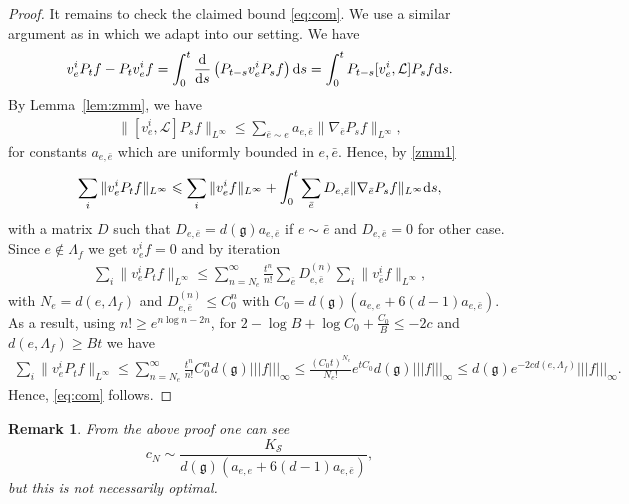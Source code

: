 \documentclass[11pt,UTF-8,reqno]{amsart}
\numberwithin{equation}{section}
\newtheorem{remark}[theorem]{Remark}
\def\${|\!|\!|}
\def\<{{\langle}}
\def\>{{\rangle}}
\def\dif{{\mathord{{\rm d}}}}
\def\={&\!\!=\!\!&}
\def\cL{{\mathcal L}}
\def\cS{{\mathcal S}}
\def\geq{\geqslant}
\def\leq{\leqslant}
\def\<{{\langle}}
\def\>{{\rangle}}
\def\dif{{\mathord{{\rm d}}}}
\def\={&\!\!=\!\!&}
\def\br{\begin{remark}}
\def\er{\end{remark}}
\def\mfg{\mathfrak{g}}
\def\geq{\geqslant}
\def\leq{\leqslant}
\def\dg{d(\mfg)}
\def\<{\langle} \def\>{\rangle}
\begin{document}
\begin{proof}
	It remains to check the claimed bound \eqref{eq:com}. We use a similar argument as in \cite[Theorem 8.2]{GZ} which we adapt into our setting.  We have
	\begin{align}\label{zmm1}
		v_e^iP_tf-P_tv_e^if=\int_0^t\frac{\dif}{\dif s} \left( P_{t-s}v_e^iP_sf\right)\dif s=\int_0^tP_{t-s}[v_e^i,\cL]P_sf \dif s.
	\end{align}
	By Lemma~\ref{lem:zmm}, we have
	\begin{align*}
		\|[v_e^i,\cL]P_sf\|_{L^\infty}\leq \sum_{\bar e\sim e} a_{e,\bar e} \|\nabla_{\bar e} P_sf\|_{L^\infty},
	\end{align*}
	 for  constants $a_{e,\bar e}$ which are uniformly bounded in $e,\bar e$.  Hence, by \eqref{zmm1}
	\begin{align*}
		\sum_i\|v_e^i P_tf\|_{L^\infty}\leq \sum_i\|v_e^i f\|_{L^\infty}+\int_0^t\sum_{\bar e} D_{e,\bar e} \|\nabla_{\bar e} P_sf\|_{L^\infty}\dif s,
	\end{align*}
	with a matrix $D$ such that $D_{e,\bar e}=\dg a_{e,\bar e}$ if $e\sim \bar e$ and $D_{e,\bar e}=0$ for other case.
	Since $e\notin \Lambda_f$ we get $v_e^i f=0$ and by iteration
	\begin{align*}
		\sum_i\|v_e^i P_tf\|_{L^\infty}\leq\sum_{n=N_e}^\infty \frac{t^n}{n!}\sum_{\bar e}D_{e,\bar e}^{(n)} \sum_i\|v_{\bar e}^i f\|_{L^\infty},
	\end{align*}
	with $N_e=d(e,\Lambda_f)$ and $D_{e,\bar e}^{(n)}\leq C^n_0$ with $C_0=\dg (a_{e,e}+6(d-1)a_{e,\bar e})$. As a result, using $n!\geq e^{n\log n-2n}$, for $2-\log B+\log C_0+\frac{C_0}{B}\leq -2c$ and $d(e,\Lambda_f)\geq Bt$ we have
	\begin{align*}
	\sum_i\|v_e^i P_tf\|_{L^\infty}
	\leq\sum_{n=N_e}^\infty \frac{t^n}{n!}C_0^n \dg \$ f \$_{\infty}
	\leq \frac{(C_0t)^{N_e}}{N_e!}e^{tC_0} \dg \$ f \$_{\infty}
	\leq \dg e^{-2c d(e,\Lambda_f)}\$ f \$_{\infty}.
	\end{align*}
	Hence, \eqref{eq:com} follows.
\end{proof}

\br
From the above proof one can see 
$$
c_N\sim \frac{K_\cS}{\dg (a_{e,e}+6(d-1)a_{e,\bar e})},
$$ but this is not necessarily optimal.
\er
\end{document}
